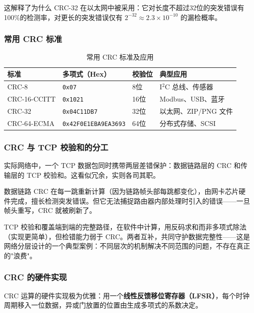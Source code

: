 这解释了为什么 CRC-32 在以太网中被采用：它对长度不超过32位的突发错误有100\%的检测率，对更长的突发错误仅有 $2^{-32} \approx 2.3 \times 10^{-10}$ 的漏检概率。

\subsubsection{常用 CRC 标准}

\begin{table}[htbp]
\centering
\caption{常用 CRC 标准及应用}
\begin{tabular}{llll}
\hline
\textbf{标准} & \textbf{多项式（Hex）} & \textbf{校验位} & \textbf{典型应用} \\
\hline
CRC-8       & \texttt{0x07}           & 8位  & I$^2$C 总线、传感器 \\
CRC-16-CCITT & \texttt{0x1021}        & 16位 & Modbus、USB、蓝牙 \\
CRC-32      & \texttt{0x04C11DB7}     & 32位 & 以太网、ZIP/PNG 文件 \\
CRC-64-ECMA & \texttt{0x42F0E1EBA9EA3693} & 64位 & 分布式存储、SCSI \\
\hline
\end{tabular}
\label{tab:crc-standards}
\end{table}

\subsubsection{CRC 与 TCP 校验和的分工}

实际网络中，一个 TCP 数据包同时携带两层差错保护：数据链路层的 CRC 和传输层的 TCP 校验和。这看似冗余，实则各司其职。

数据链路 CRC 在每一跳重新计算（因为链路帧头部每跳都变化），由网卡芯片硬件完成，擅长检测突发错误。但它无法捕捉路由器内部处理时引入的错误——一旦帧头重写，CRC 就被刷新了。

TCP 校验和覆盖端到端的完整路径，在软件中计算，用反码求和而非多项式除法（实现更简单），但检错能力弱于 CRC。两者互补，共同守护数据完整性——这是网络分层设计的一个典型案例：不同层次的机制解决不同范围的问题，不存在真正的"浪费"。

\subsubsection{CRC 的硬件实现}

CRC 运算的硬件实现极为优雅：用一个\textbf{线性反馈移位寄存器（LFSR）}，每个时钟周期移入一位数据，异或门放置的位置由生成多项式的系数决定。

